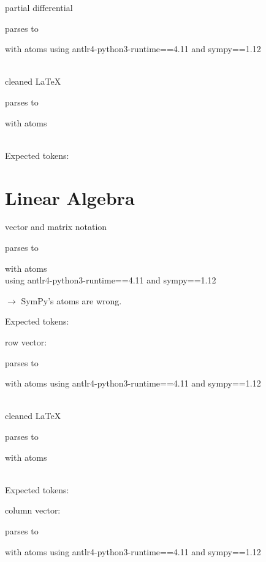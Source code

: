\documentclass{article}
\begin{document}
\hrulefill


partial differential

parses to

with atoms
using antlr4-python3-runtime==4.11 and sympy==1.12

\ \\
cleaned \LaTeX

parses to

with atoms


\ \\
Expected tokens:



\hrulefill


\section{Linear Algebra}
vector and matrix notation
    
parses to

with atoms 
\\
using antlr4-python3-runtime==4.11 and sympy==1.12

$\rightarrow$ SymPy's atoms are wrong.

Expected tokens: 


\hrulefill



row vector:

parses to

with atoms
using antlr4-python3-runtime==4.11 and sympy==1.12

\ \\
cleaned \LaTeX

parses to

with atoms


\ \\
Expected tokens:



\hrulefill


column vector:

parses to

with atoms
using antlr4-python3-runtime==4.11 and sympy==1.12
\end{document}
